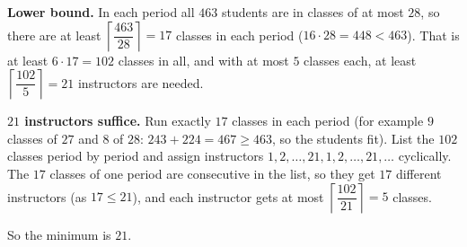 \textbf{Lower bound.} In each period all $463$ students are in classes of at most $28$, so there are at least $\left\lceil\dfrac{463}{28}\right\rceil=17$ classes in each period ($16\cdot28=448<463$). That is at least $6\cdot17=102$ classes in all, and with at most $5$ classes each, at least $\left\lceil\dfrac{102}{5}\right\rceil=21$ instructors are needed.

\textbf{$21$ instructors suffice.} Run exactly $17$ classes in each period (for example $9$ classes of $27$ and $8$ of $28$: $243+224=467\ge463$, so the students fit). List the $102$ classes period by period and assign instructors $1,2,\dots,21,1,2,\dots,21,\dots$ cyclically. The $17$ classes of one period are consecutive in the list, so they get $17$ different instructors (as $17\le21$), and each instructor gets at most $\left\lceil\dfrac{102}{21}\right\rceil=5$ classes.

So the minimum is $\boxed{21}$.

